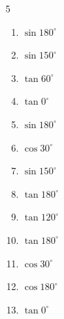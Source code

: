 \begin{multicols}{5}
\begin{enumerate}
  \item $\displaystyle \sin{180^\circ}$

        \phantom{$\displaystyle =0$}

  \item $\displaystyle \sin{150^\circ}$


  \item $\displaystyle \tan{60^\circ}$


  \item $\displaystyle \tan{0^\circ}$

        \phantom{$\displaystyle =0$}

  \item $\displaystyle \sin{180^\circ}$

        \phantom{$\displaystyle =0$}

  \item $\displaystyle \cos{30^\circ}$


  \item $\displaystyle \sin{150^\circ}$


  \item $\displaystyle \tan{180^\circ}$

        \phantom{$\displaystyle =0$}

  \item $\displaystyle \tan{120^\circ}$


  \item $\displaystyle \tan{180^\circ}$

        \phantom{$\displaystyle =0$}

\columnbreak %

  \item $\displaystyle \cos{30^\circ}$


  \item $\displaystyle \cos{180^\circ}$

        \phantom{$\displaystyle =-1$}

  \item $\displaystyle \tan{0^\circ}$


\end{enumerate}
\end{multicols}
